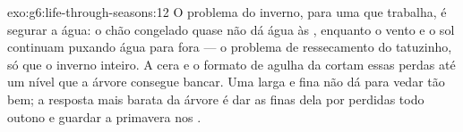 \begin{solution}{exo:g6:life-through-seasons:12}
O problema do inverno, para uma  que trabalha, é segurar a água:
o chão congelado quase não dá água às , enquanto o vento e o
sol continuam puxando água para fora --- o problema de ressecamento do
tatuzinho, só que o inverno inteiro. A cera e o formato de agulha da
  cortam essas perdas até um nível que a árvore
consegue bancar. Uma  larga e fina não dá para vedar tão bem; a
resposta mais barata da árvore  é dar as  finas dela
por perdidas todo outono e guardar a primavera nos .
\end{solution}

